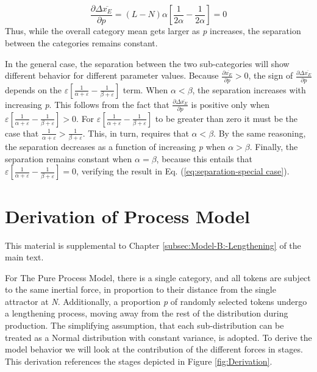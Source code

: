 \begin{equation}
\frac{\partial\Delta\overline{x_{E}}}{\partial p}=(L-N)\alpha[\frac{1}{2\alpha}-\frac{1}{2\alpha}]=0\label{eq:separation-special case}
\end{equation}
Thus, while the overall category mean gets larger as \emph{p} increases,
the separation between the categories remains constant. 

In the general case, the separation between the two sub-categories
will show different behavior for different parameter values. Because
$\frac{\partial\overline{x_{E}}}{\partial p}>0$, the sign of $\frac{\partial\Delta\overline{x_{E}}}{\partial p}$
depends on the $\varepsilon[\frac{1}{\alpha+\varepsilon}-\frac{1}{\beta+\varepsilon}]$
term. When $\alpha<\beta$, the separation increases with increasing
\emph{p}. This follows from the fact that $\frac{\partial\Delta\overline{x_{E}}}{\partial p}$
is positive only when $\varepsilon[\frac{1}{\alpha+\varepsilon}-\frac{1}{\beta+\varepsilon}]>0$.
For $\varepsilon[\frac{1}{\alpha+\varepsilon}-\frac{1}{\beta+\varepsilon}]$
to be greater than zero it must be the case that $\frac{1}{\alpha+\varepsilon}>\frac{1}{\beta+\varepsilon}$.
This, in turn, requires that $\alpha<\beta$. By the same reasoning,
the separation decreases as a function of increasing \emph{p} when
$\alpha>\beta$. Finally, the separation remains constant when $\alpha=\beta$,
because this entails that $\varepsilon[\frac{1}{\alpha+\varepsilon}-\frac{1}{\beta+\varepsilon}]=0$,
verifying the result in Eq. (\ref{eq:separation-special case}).

\chapter{\label{chap:Appendix D}Derivation of Process Model}

This material is supplemental to Chapter \ref{subsec:Model-B:-Lengthening}
of the main text.

For The Pure Process Model, there is a single category, and all tokens
are subject to the same inertial force, in proportion to their distance
from the single attractor at \emph{N}. Additionally, a proportion
\emph{p} of randomly selected tokens undergo a lengthening process,
moving away from the rest of the distribution during production. The
simplifying assumption, that each sub-distribution can be treated
as a Normal distribution with constant variance, is adopted. To derive
the model behavior we will look at the contribution of the different
forces in stages. This derivation references the stages depicted in
Figure \ref{fig:Derivation}.

